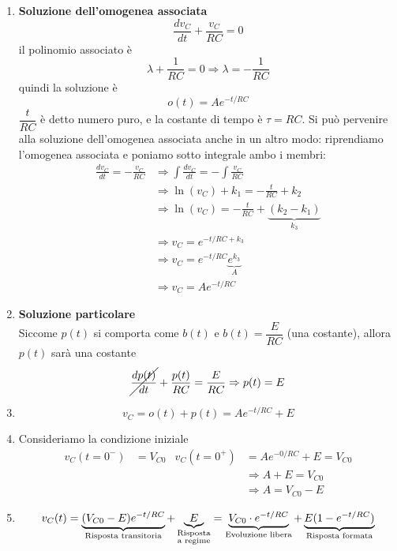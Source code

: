\documentclass{article}
\begin{document}
\begin{enumerate}
    \item \textbf{Soluzione dell'omogenea associata}
    \[
        \frac{dv_C}{dt} + \frac{v_C}{RC} = 0
    \]
    il polinomio associato è 
    \[
        \lambda + \frac{1}{RC} = 0 \Rightarrow \lambda = -\frac{1}{RC}
    \]
    quindi la soluzione è
    \[
        o(t) = A e^{-t/RC}
    \]
    $\dfrac{t}{RC}$ è detto numero puro, e la costante di tempo è $\tau = RC$.
    Si può pervenire alla soluzione dell'omogenea associata anche in un altro modo: riprendiamo l'omogenea associata e poniamo sotto integrale ambo i membri:
    \begin{align*}
        \frac{dv_C}{dt} = -\frac{v_C}{RC} &\Rightarrow \int \frac{dv_C}{dt} = -\int\frac{v_C}{RC}\\
        &\Rightarrow \ln(v_C) + k_1 = - \frac{t}{RC} + k_2\\
        &\Rightarrow \ln(v_C) = - \frac{t}{RC} + \underbrace{(k_2 - k_1)}_{k_3}\\
        &\Rightarrow v_C = e^{-t/RC+k_3}\\
        &\Rightarrow v_C = e^{-t/RC}\underbrace{e^{k_3}}_{A}\\
        &\Rightarrow v_C = A e^{-t/RC}
    \end{align*}

    \item \textbf{Soluzione particolare}\\
    Siccome $p(t)$ si comporta come $b(t)$ e $b(t)=\dfrac{E}{RC}$ (una costante), allora $p(t)$ sarà una costante
    \[
        \cancel{\frac{dp(t)}{dt}} + \frac{p(t)}{RC} = \frac{E}{RC} \Rightarrow p(t) = E    
    \]

    \item \[ v_C = o(t) + p(t)  = A e^{-t/RC}+E \]
    
    \item Consideriamo la condizione iniziale
    \begin{align*}
        v_C(t=0^-) &= V_{C0} & v_C(t=0^+) &= A e^{-0/RC} + E = V_{C0}\\
        & & &\Rightarrow A + E = V_{C0}\\
        & & &\Rightarrow A=V_{C0} - E
    \end{align*}

    \item \[ v_C(t) = \underbrace{(V_{C0}-E)e^{-t/RC}}_{\text{Risposta transitoria}} + \underbrace{E}_{\substack{\text{Risposta}\\\text{a regime}}} = \underbrace{V_{C0} \cdot  e^{-t/RC}}_{\text{Evoluzione libera}} + \underbrace{E(1-e^{-t/RC})}_{\text{Risposta formata}} \]
\end{enumerate}
\end{document}
